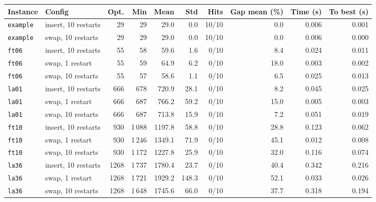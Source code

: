 \begin{tabular}{llrrrrrrrr}
\toprule
Instance & Config & Opt. & Min & Mean & Std & Hits & Gap mean (\%) & Time (s) & To best (s) \\
\midrule
\texttt{example} & insert, 10 restarts & 29 & 29 & 29.0 & 0.0 & 10/10 & 0.0 & 0.006 & 0.001 \\
\texttt{example} & swap, 10 restarts & 29 & 29 & 29.0 & 0.0 & 10/10 & 0.0 & 0.006 & 0.000 \\
\texttt{ft06} & insert, 10 restarts & 55 & 58 & 59.6 & 1.6 & 0/10 & 8.4 & 0.024 & 0.011 \\
\texttt{ft06} & swap, 1 restart & 55 & 59 & 64.9 & 6.2 & 0/10 & 18.0 & 0.003 & 0.002 \\
\texttt{ft06} & swap, 10 restarts & 55 & 57 & 58.6 & 1.1 & 0/10 & 6.5 & 0.025 & 0.013 \\
\texttt{la01} & insert, 10 restarts & 666 & 678 & 720.9 & 28.1 & 0/10 & 8.2 & 0.045 & 0.025 \\
\texttt{la01} & swap, 1 restart & 666 & 687 & 766.2 & 59.2 & 0/10 & 15.0 & 0.005 & 0.003 \\
\texttt{la01} & swap, 10 restarts & 666 & 687 & 713.8 & 15.9 & 0/10 & 7.2 & 0.051 & 0.019 \\
\texttt{ft10} & insert, 10 restarts & 930 & 1\,088 & 1197.8 & 58.8 & 0/10 & 28.8 & 0.123 & 0.062 \\
\texttt{ft10} & swap, 1 restart & 930 & 1\,246 & 1349.1 & 71.9 & 0/10 & 45.1 & 0.012 & 0.008 \\
\texttt{ft10} & swap, 10 restarts & 930 & 1\,172 & 1227.8 & 25.9 & 0/10 & 32.0 & 0.116 & 0.074 \\
\texttt{la36} & insert, 10 restarts & 1268 & 1\,737 & 1780.4 & 23.7 & 0/10 & 40.4 & 0.342 & 0.216 \\
\texttt{la36} & swap, 1 restart & 1268 & 1\,721 & 1929.2 & 148.3 & 0/10 & 52.1 & 0.033 & 0.026 \\
\texttt{la36} & swap, 10 restarts & 1268 & 1\,648 & 1745.6 & 66.0 & 0/10 & 37.7 & 0.318 & 0.194 \\
\bottomrule
\end{tabular}
